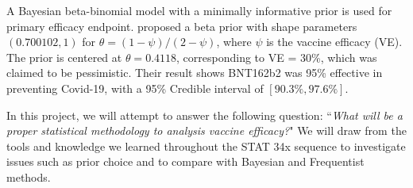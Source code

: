 \documentclass[12pt]{amsart}
\begin{document}
A Bayesian beta-binomial model with a minimally informative prior is used for primary efficacy endpoint. \cite{paper} proposed a beta prior with shape parameters $(0.700102, 1)$ for $\theta = (1 - \psi) /(2 - \psi)$, where $\psi$ is the vaccine efficacy (VE). The prior is centered at $\theta = 0.4118$, corresponding to VE = 30\%, which was claimed to be pessimistic. Their result shows BNT162b2 was 95\% effective in preventing Covid-19, with a 95\% Credible interval of $[90.3\%, 97.6\%]$.

In this project, we will attempt to answer the following question: ``\textit{What will be a proper statistical methodology to analysis vaccine efficacy?}" We will draw from the tools and knowledge we learned throughout the STAT 34x sequence to investigate issues such as prior choice and to compare with Bayesian and Frequentist methods.

\end{document}
